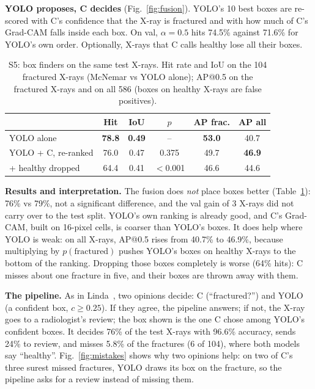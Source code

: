 \documentclass[conference]{IEEEtran}
\begin{document}
\textbf{YOLO proposes, C decides} (Fig.~\ref{fig:fusion}). YOLO's 10 best boxes are re-scored with C's confidence that
the X-ray is fractured and with how much of C's Grad-CAM falls inside each box. On val, $\alpha=0.5$ hits 74.5\% against
71.6\% for YOLO's own order. Optionally, X-rays that C calls healthy lose all their boxes.

\begin{table}[t]
\centering
\caption{S5: box finders on the same test X-rays. Hit rate and IoU on the 104 fractured X-rays (McNemar vs YOLO alone);
AP@0.5 on the fractured X-rays and on all 586 (boxes on healthy X-rays are false positives).}
\label{tab:fusion}
\renewcommand{\arraystretch}{1.1}
\setlength{\tabcolsep}{2.8pt}
\begin{tabular}{lccccc}
\toprule
 & Hit & IoU & $p$ & AP frac. & AP all \\
\midrule
YOLO alone                 & \textbf{78.8} & \textbf{0.49} & --    & \textbf{53.0} & 40.7 \\
YOLO + C, re-ranked        & 76.0 & 0.47 & 0.375 & 49.7 & \textbf{46.9} \\
\quad + healthy dropped    & 64.4 & 0.41 & $<$0.001 & 46.6 & 44.6 \\
\bottomrule
\end{tabular}
\end{table}

\textbf{Results and interpretation.} The fusion does \emph{not} place boxes better (Table~\ref{tab:fusion}): 76\% vs 79\%,
not a significant difference, and the val gain of 3 X-rays did not carry over to the test split. YOLO's own ranking is
already good, and C's Grad-CAM, built on 16-pixel cells, is coarser than YOLO's boxes. It does help where YOLO is weak:
on all X-rays, AP@0.5 rises from 40.7\% to 46.9\%, because multiplying by $p(\text{fractured})$ pushes YOLO's boxes on
healthy X-rays to the bottom of the ranking. Dropping those boxes completely is worse (64\% hits): C misses about one
fracture in five, and their boxes are thrown away with them.

\textbf{The pipeline.} As in Linda~\cite{linda2025}, two opinions decide: C (``fractured?'') and YOLO (a confident box,
$c\ge0.25$). If they agree, the pipeline answers; if not, the X-ray goes to a radiologist's review; the box shown is the
one C chose among YOLO's confident boxes. It decides 76\% of the test X-rays with 96.6\% accuracy, sends 24\% to review,
and misses 5.8\% of the fractures (6 of 104), where both models say ``healthy''. Fig.~\ref{fig:mistakes} shows why two
opinions help: on two of C's three surest missed fractures, YOLO draws its box on the fracture, so the pipeline asks for
a review instead of missing them.
\end{document}
